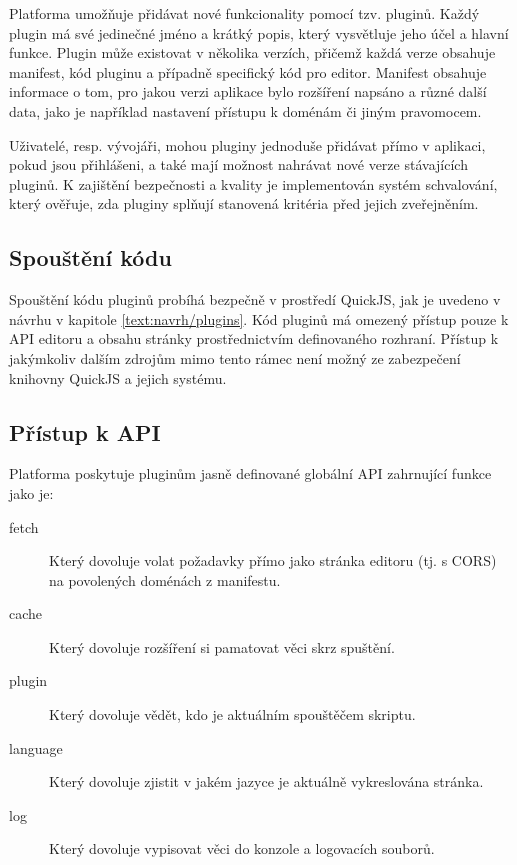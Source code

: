 Platforma umožňuje přidávat nové funkcionality pomocí tzv. pluginů. 
Každý plugin má své jedinečné jméno a krátký popis, který vysvětluje jeho účel a hlavní funkce. 
Plugin může existovat v několika verzích, přičemž každá verze obsahuje manifest, kód pluginu a případně specifický kód pro editor.
Manifest obsahuje informace o tom, pro jakou verzi aplikace bylo rozšíření napsáno a různé další data, jako je například nastavení přístupu k doménám či jiným pravomocem.

Uživatelé, resp. vývojáři, mohou pluginy jednoduše přidávat přímo v aplikaci, pokud jsou přihlášeni, a také mají možnost nahrávat nové verze stávajících pluginů. 
K zajištění bezpečnosti a kvality je implementován systém schvalování, který ověřuje, zda pluginy splňují stanovená kritéria před jejich zveřejněním.

\subsection{Spouštění kódu}

Spouštění kódu pluginů probíhá bezpečně v prostředí QuickJS, jak je uvedeno v návrhu v kapitole \ref{text:navrh/plugins}. 
Kód pluginů má omezený přístup pouze k API editoru a obsahu stránky prostřednictvím definovaného rozhraní. 
Přístup k jakýmkoliv dalším zdrojům mimo tento rámec není možný ze zabezpečení knihovny QuickJS a jejich systému.

\subsection{Přístup k API}

Platforma poskytuje pluginům jasně definované globální API zahrnující funkce jako je:

\begin{description}
    \item[fetch] Který dovoluje volat požadavky přímo jako stránka editoru (tj. s CORS) na povolených doménách z manifestu.
    \item[cache] Který dovoluje rozšíření si pamatovat věci skrz spuštění.
    \item[plugin] Který dovoluje vědět, kdo je aktuálním spouštěčem skriptu.
    \item[language] Který dovoluje zjistit v jakém jazyce je aktuálně vykreslována stránka.
    \item[log] Který dovoluje vypisovat věci do konzole a logovacích souborů.
\end{description}

